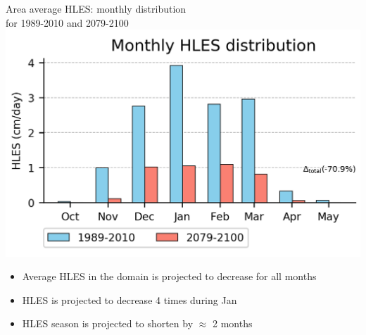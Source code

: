 \documentclass{beamer}
\begin{document}
  \begin{frame}{Area average HLES: monthly distribution\\for 1989-2010 and 2079-2100}
    \centering
    \includegraphics[height=0.55\textheight]{hles_snow_histo_cc_m10_11_12_1_2_3_4_5_domain}
    \begin{itemize}
      \item Average HLES in the domain is projected to decrease for all months
      \item HLES is projected to decrease 4 times during Jan
      \item HLES season is projected to shorten by $\approx$ 2 months
    \end{itemize}
  \end{frame}
\end{document}
